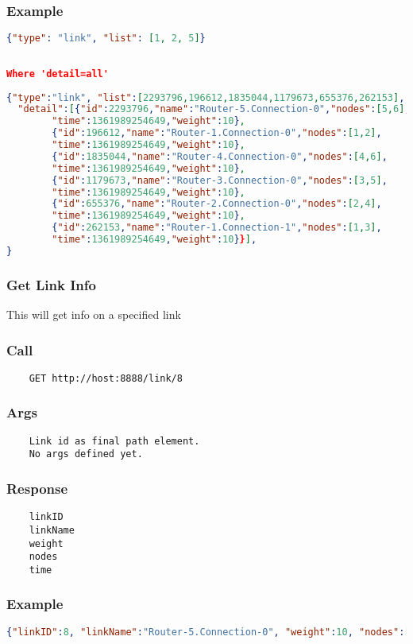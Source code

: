 \subsubsection*{Example}
\begin{lstlisting}[language=json]
{"type": "link", "list": [1, 2, 5]} 
	
	
Where 'detail=all'
	
{"type":"link", "list":[2293796,196612,1835044,1179673,655376,262153],
  "detail":[{"id":2293796,"name":"Router-5.Connection-0","nodes":[5,6], 
		"time":1361989254649,"weight":10},
		{"id":196612,"name":"Router-1.Connection-0","nodes":[1,2],
		"time":1361989254649,"weight":10},
		{"id":1835044,"name":"Router-4.Connection-0","nodes":[4,6],
		"time":1361989254649,"weight":10},
		{"id":1179673,"name":"Router-3.Connection-0","nodes":[3,5],
		"time":1361989254649,"weight":10},
		{"id":655376,"name":"Router-2.Connection-0","nodes":[2,4],
		"time":1361989254649,"weight":10},
		{"id":262153,"name":"Router-1.Connection-1","nodes":[1,3],
		"time":1361989254649,"weight":10}}],
}
\end{lstlisting}


\hr
\subsubsection{Get Link Info}
This will get info on a specified link
\subsubsection*{Call}
\begin{verbatim}
	GET http://host:8888/link/8
\end{verbatim}

\subsubsection*{Args}
\begin{verbatim}
	Link id as final path element.
	No args defined yet.
\end{verbatim}

\subsubsection*{Response}
\begin{verbatim}
	linkID
	linkName
	weight
	nodes
	time
\end{verbatim}

\subsubsection*{Example}
\begin{lstlisting}[language=json]
{"linkID":8, "linkName":"Router-5.Connection-0", "weight":10, "nodes":[5,6], "time":1362079709109}
\end{lstlisting}


